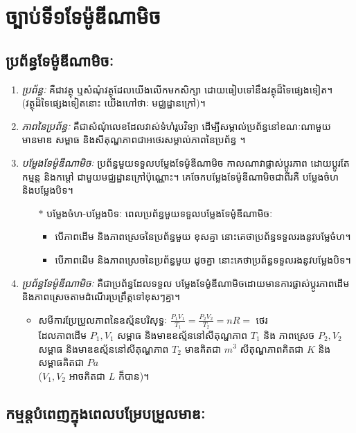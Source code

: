 \chapter{ច្បាប់ទី១ទែម៉ូឌីណាមិច}
\section{ប្រព័ន្ធទែម៉ូឌីណាមិចៈ}
\begin{definition}
	\begin{enumerate}[m]
		\item \emph{ប្រព័ន្ធៈ} គឺជាវត្ថុ ឬសំណុំវត្ថុដែលយើងលើកមកសិក្សា ដោយធៀបទៅនឹងវត្ថុដ៏ទៃផ្សេងទៀត។\\(វត្ថុដ៏ទៃផ្សេងទៀតនោះ យើងហៅថាៈ មជ្ឈដ្ឋានក្រៅ)។
		\item \emph{ភាពនៃប្រព័ន្ធៈ} គឺជាសំណុំលេខដែលវាស់ទំហំរូបវិទ្យា ដើម្បីសម្គាល់ប្រព័ន្ធនៅខណៈណាមួយ មានមាឌ សម្ពាធ និងសីតុណ្ហភាពជាអថេរសម្គាល់ភាពនៃប្រព័ន្ធ ។
		\item \emph{បម្លែងទែម៉ូឌីណាមិចៈ} ប្រព័ន្ធមួយទទួលបម្លែងទែម៉ូឌីណាមិច កាលណាវាផ្លាស់ប្តូរភាព ដោយប្តូរតែ កម្មន្ត និងកម្តៅ ជាមួយមជ្ឈដ្ឋានក្រៅប៉ុណ្ណោះ។ គេចែកបម្លែងទែម៉ូឌីណាមិចជាពីរគឺ បម្លែងចំហ និងបម្លែងបិទ។
		\begin{itemize}
			\item [$\ast$] បម្លែងចំហ-បម្លែងបិទៈ ពេលប្រព័ន្ធមួយទទួលបម្លែងទែម៉ូឌីណាមិចៈ
			\begin{itemize}
				\item បើភាពដើម និងភាពស្រេចនៃប្រព័ន្ធមួយ ខុសគ្នា នោះគេថាប្រព័ន្ធទទួលរងនូវបម្លែចំហ។
				\item បើភាពដើម និងភាពស្រេចនៃប្រព័ន្ធមួយ ដូចគ្នា នោះគេថាប្រព័ន្ធទទួលរងនូវបម្លែងបិទ។
			\end{itemize}
		\end{itemize}
	\item \emph{ប្រព័ន្ធទែម៉ូឌីណាមិចៈ} គឺជាប្រព័ន្ធដែលទទួល បម្លែងទែម៉ូឌីណាមិចដោយមានការផ្លាស់ប្តូរភាពដើម និងភាពស្រេចតាមដំណើរប្រព្រឹត្តទៅខុសៗគ្នា។
	\begin{itemize}
		\item សមីការប្រែប្រួលភាពនៃឧស្ម័នបរិសុទ្ធៈ $\frac{P_1V_1}{T_1}=\frac{P_2V_2}{T_2}=nR=$ ថេរ\\
		ដែលភាពដើម $P_1,V_1$ សម្ពាធ និងមាឌឧស្ម័ននៅសីតុណ្ហភាព $T_1$ និង ភាពស្រេច $P_2,V_2$ សម្ពាធ និងមាឌឧស្ម័ននៅសីតុណ្ហភាព $T_2$ មាឌគិតជា $m^{3}$ សីតុណ្ហភាពគិតជា $K$ និងសម្ពាធគិតជា $Pa$\\($V_1, V_2$ អាចគិតជា $L$ ក៏បាន)។
	\end{itemize}
	\end{enumerate}
\end{definition}
\section{កម្មន្តបំពេញក្នុងពេលបម្រែបម្រួលមាឌៈ}
